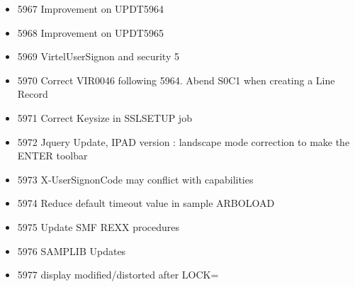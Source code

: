 \documentclass[letterpaper,10pt,english]{sphinxmanual}
\begin{document}
\begin{itemize}
\item {} 
5967 Improvement on UPDT5964

\item {} 
5968 Improvement on UPDT5965

\item {} 
5969 VirtelUserSignon and security 5

\item {} 
5970 Correct VIR0046 following 5964. Abend S0C1 when creating a Line Record

\item {} 
5971 Correct Keysize in SSLSETUP job

\item {} 
5972 Jquery Update, IPAD version : landscape mode correction to make the ENTER toolbar

\item {} 
5973 X-UserSignonCode may conflict with capabilities

\item {} 
5974 Reduce default timeout value in sample ARBOLOAD

\item {} 
5975 Update SMF REXX procedures

\item {} 
5976 SAMPLIB Updates

\item {} 
5977 display modified/distorted after LOCK=

\end{itemize}



\renewcommand{\indexname}{Index}
\printindex
\end{document}
